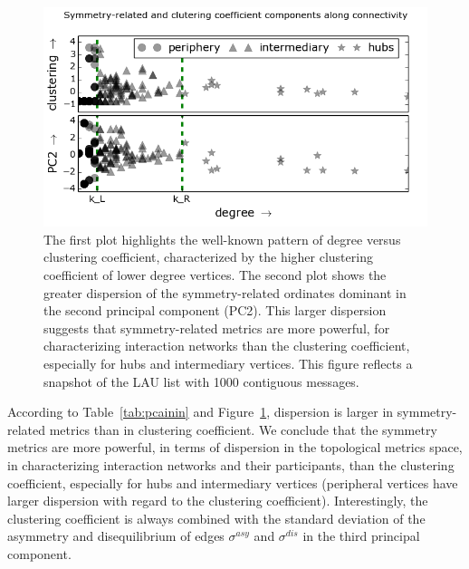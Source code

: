 \begin{figure} 
\centering
\includegraphics[width=.45\textwidth]{figs/im13PCAPLOT__}
\caption{The first plot highlights the well-known pattern of degree versus clustering coefficient, characterized by the higher clustering coefficient of lower degree vertices.
    The second plot shows the greater dispersion of the symmetry-related ordinates dominant in the second principal component (PC2).
This larger dispersion suggests that symmetry-related metrics are more powerful,
for characterizing interaction networks than the clustering coefficient,
especially for hubs and intermediary vertices.
This figure reflects a snapshot of the LAU list with 1000 contiguous messages.}

\label{fig:sym}
\end{figure}

According to Table~\ref{tab:pcainin} and Figure~\ref{fig:sym},
dispersion is larger in symmetry-related metrics than in clustering coefficient.
We conclude that the symmetry metrics are more powerful, in terms of dispersion in the topological metrics space, in characterizing interaction networks and their participants, than the clustering coefficient, especially for hubs and intermediary vertices (peripheral vertices have larger dispersion with regard to the clustering coefficient).
Interestingly, the clustering coefficient is always combined
with the standard deviation of the asymmetry and disequilibrium
of edges $\sigma^{asy}$ and $\sigma^{dis}$ in the third principal component.

